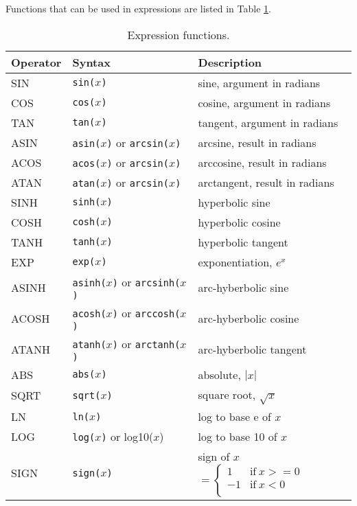Functions that can be used in expressions are listed in Table
\ref{table:expression:functions}. 

\begin{table}
\caption{Expression functions.\label{table:expression:functions}}
\begin{center}
\begin{tabular}{|l|l|l|}
\hline
{\bf Operator }	& {\bf   Syntax } & {\bf Description}  \\
\hline
SIN		&{\tt sin($x$)}	& sine, argument in radians \\
COS		& {\tt cos($x$)}	& cosine, argument in radians \\
TAN		& {\tt tan($x$)}	& tangent, argument in radians \\
ASIN		& {\tt asin($x$)} or {\tt arcsin($x$)}
					& arcsine, result in radians \\
ACOS		& {\tt acos($x$)} or {\tt arcsin($x$)}
					& arccosine, result in radians \\
ATAN		& {\tt atan($x$)} or {\tt arcsin($x$)}
					& arctangent, result in radians \\
SINH		& {\tt sinh($x$)}	& hyperbolic sine \\
COSH		& {\tt cosh($x$)}	& hyperbolic cosine \\
TANH		& {\tt tanh($x$)}	& hyperbolic tangent \\
EXP		& {\tt exp($x$)}	& exponentiation, $e^x$ \\
ASINH		& {\tt asinh($x$)} or {\tt arcsinh($x$)}
                                        & arc-hyberbolic sine \\
ACOSH		& {\tt acosh($x$)} or {\tt arccosh($x$)}
					& arc-hyberbolic cosine \\
ATANH		& {\tt atanh($x$)} or {\tt arctanh($x$)}
					& arc-hyberbolic tangent \\
ABS		& {\tt abs($x$)}	& absolute, $|x|$ \\
SQRT		& {\tt sqrt($x$)}	& square root, $\sqrt{x}$ \\
LN		& {\tt ln($x$)}		& log to base e of $x$ \\
LOG		& {\tt log($x$)} or log10($x$)	& log to base 10 of $x$ \\
SIGN		& {\tt sign($x$)}		& sign of $x$
						$= \left\{ \begin{array}{rl}
                                                   1 & \mbox{if}~ x >= 0 \\
                                                  -1 & \mbox{if}~ x<0 \\
				          	\end{array}  \right. $ \\ %

\end{tabular}
\end{center}
\end{table}
